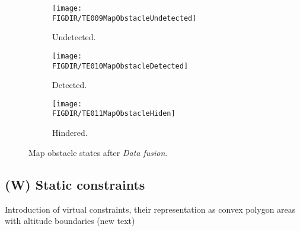     
    \begin{figure}[H]
        \begin{subfigure}{0.32\textwidth}
            \texttt{[image: \\FIGDIR/TE009MapObstacleUndetected]} 
            \caption{Undetected.}
            \label{fig:undetectedMapObstalce.}
        \end{subfigure}
        \begin{subfigure}{0.32\textwidth}
            \texttt{[image: \\FIGDIR/TE010MapObstacleDetected]} 
            \caption{Detected.}
            \label{fig:detectedMapObstacle}
        \end{subfigure}
        \begin{subfigure}{0.32\textwidth}
            \texttt{[image: \\FIGDIR/TE011MapObstacleHiden]}
            \caption{Hindered.}
            \label{fig:hinderedMapObstacle}
        \end{subfigure}
        \caption{Map obstacle states after \emph{Data fusion}.}
        \label{fig:mapObstacleStatesAfterDataFusion}
    \end{figure}

\subsection{(W) Static constraints}\label{s:virtualConstraints}
    \noindent Introduction of virtual constraints, their representation as convex polygon areas with altitude boundaries (new text)
    
